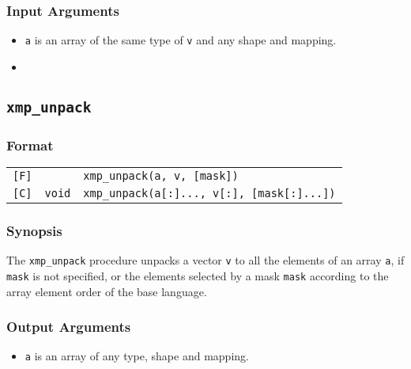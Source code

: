 \subsubsection*{Input Arguments}
\begin{itemize}
 \item {\tt a} is an array of the same type of {\tt v} and any shape
       and mapping.
 \item {}
\end{itemize}


\subsection{\tt xmp\_unpack}
\label{155321_16Jan17}

\subsubsection*{Format}

\begin{tabular}{lll}

\verb![F]!&            & {\tt xmp\_unpack(a, v, [mask])}\\

\verb![C]!& {\tt void} & {\tt xmp\_unpack(a[:]..., v[:], [mask[:]...])}\\

\end{tabular}

\subsubsection*{Synopsis}

The {\tt xmp\_unpack} procedure unpacks a vector {\tt v} to all the
elements of an array {\tt a}, if {\tt mask} is not specified, or the
elements selected by a mask {\tt mask} according
to the array element order of the base language.

\subsubsection*{Output Arguments}
\begin{itemize}
 \item {\tt a} is an array of any type, shape and mapping.
\end{itemize}

